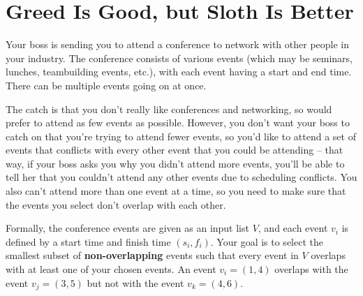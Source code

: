 \section{Greed Is Good, but Sloth Is Better}

Your boss is sending you to attend a conference to network with other people in your industry. The conference consists of various events (which may be seminars, lunches, teambuilding events, etc.), with each event having a start and end time. There can be multiple events going on at once.

The catch is that you don't really like conferences and networking, so would prefer to attend as few events as possible. However, you don't want your boss to catch on that you're trying to attend fewer events, so you'd like to attend a set of events that conflicts with every other event that you could be attending -- that way, if your boss asks you why you didn't attend more events, you'll be able to tell her that you couldn't attend any other events due to scheduling conflicts. You also can't attend more than one event at a time, so you need to make sure that the events you select don't overlap with each other.

Formally, the conference events are given as an input list $V$, and each event $v_i$ is defined by a start time and finish time $(s_i, f_i)$. Your goal is to select the smallest subset of \textbf{non-overlapping} events such that every event in $V$ overlaps with at least one of your chosen events. An event $v_i = (1,4)$ overlaps with the event $v_j = (3,5)$ but not with the event $v_k = (4,6)$.

